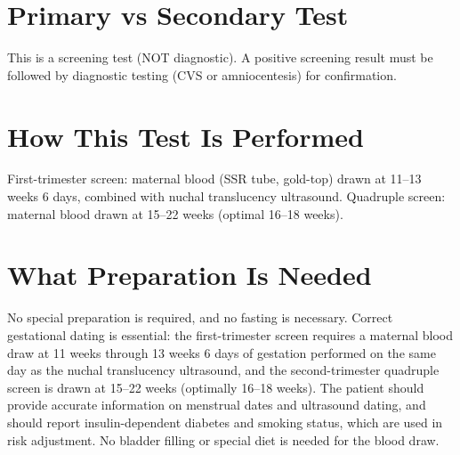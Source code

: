 \section*{Primary vs Secondary Test}
This is a screening test (NOT diagnostic). A positive screening result must be followed by diagnostic testing (CVS or amniocentesis) for confirmation.

\section*{How This Test Is Performed}
First-trimester screen: maternal blood (SSR tube, gold-top) drawn at 11--13 weeks 6 days, combined with nuchal translucency ultrasound. Quadruple screen: maternal blood drawn at 15--22 weeks (optimal 16--18 weeks).

\section*{What Preparation Is Needed}
No special preparation is required, and no fasting is necessary. Correct gestational dating is essential: the first-trimester screen requires a maternal blood draw at 11 weeks through 13 weeks 6 days of gestation performed on the same day as the nuchal translucency ultrasound, and the second-trimester quadruple screen is drawn at 15--22 weeks (optimally 16--18 weeks). The patient should provide accurate information on menstrual dates and ultrasound dating, and should report insulin-dependent diabetes and smoking status, which are used in risk adjustment. No bladder filling or special diet is needed for the blood draw.


